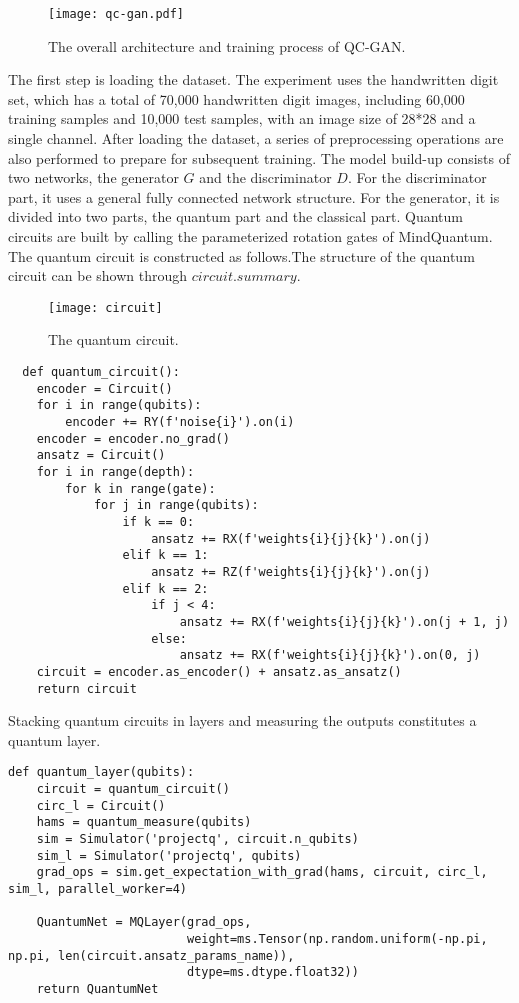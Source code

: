 \begin{figure}[ht]
  \centering
  \texttt{[image: qc-gan.pdf]}
  \caption{\label{qc-gan} The overall architecture and training process of QC-GAN.}
\end{figure} 

The first step is loading the dataset. The experiment uses the handwritten digit set, which has a total of 70,000 handwritten digit images, including 60,000 training samples and 10,000 test samples, with an image size of 28*28 and a single channel. After loading the dataset, a series of preprocessing operations are also performed to prepare for subsequent training. The model build-up consists of two networks, the generator ${G}$ and the discriminator ${D}$. For the discriminator part, it uses a general fully connected network structure. For the generator, it is divided into two parts, the quantum part and the classical part. Quantum circuits are built by calling the parameterized rotation gates of MindQuantum. The quantum circuit is constructed as follows.The structure of the quantum circuit can be shown through ${circuit.summary}$.
\begin{figure*}[htbp]
	\centering
	\texttt{[image: circuit]}
	\caption{\label{quantum-circuit} The quantum circuit.}
  \end{figure*}

\begin{lstlisting}
  def quantum_circuit():
    encoder = Circuit()
    for i in range(qubits):
        encoder += RY(f'noise{i}').on(i)
    encoder = encoder.no_grad()
    ansatz = Circuit()
    for i in range(depth):
        for k in range(gate):
            for j in range(qubits):
                if k == 0:
                    ansatz += RX(f'weights{i}{j}{k}').on(j)
                elif k == 1:
                    ansatz += RZ(f'weights{i}{j}{k}').on(j)
                elif k == 2:
                    if j < 4:
                        ansatz += RX(f'weights{i}{j}{k}').on(j + 1, j)
                    else:
                        ansatz += RX(f'weights{i}{j}{k}').on(0, j)
    circuit = encoder.as_encoder() + ansatz.as_ansatz()
    return circuit
\end{lstlisting}
Stacking quantum circuits in layers and measuring the outputs constitutes a quantum layer. 
\begin{lstlisting}
def quantum_layer(qubits):
    circuit = quantum_circuit()
    circ_l = Circuit()
    hams = quantum_measure(qubits)
    sim = Simulator('projectq', circuit.n_qubits)
    sim_l = Simulator('projectq', qubits)
    grad_ops = sim.get_expectation_with_grad(hams, circuit, circ_l, sim_l, parallel_worker=4)

    QuantumNet = MQLayer(grad_ops,
                         weight=ms.Tensor(np.random.uniform(-np.pi, np.pi, len(circuit.ansatz_params_name)),
                         dtype=ms.dtype.float32))
    return QuantumNet
\end{lstlisting}

